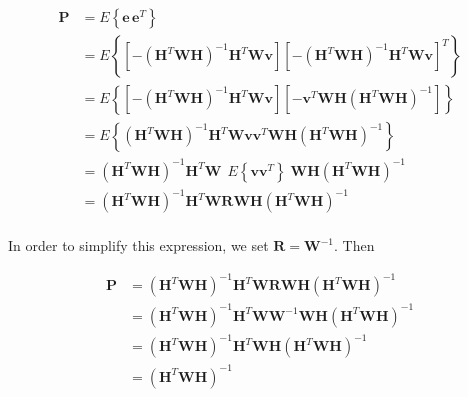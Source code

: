 \documentclass[12pt]{article}
\begin{document}
\begin{equation*}
    \begin{aligned}
        \mathbf{P} &= E \left\{ \mathbf{e} \, \mathbf{e}^T \right\} \\
        &= E \left\{ \left[ - \left( \mathbf{H}^T \mathbf{W} \mathbf{H} \right)^{-1} \mathbf{H}^T \mathbf{W} \mathbf{v} \right]
           \left[ - \left( \mathbf{H}^T \mathbf{W} \mathbf{H} \right)^{-1} \mathbf{H}^T \mathbf{W} \mathbf{v} \right]^T \right\} \\
        &= E \left\{ \left[ - \left( \mathbf{H}^T \mathbf{W} \mathbf{H} \right)^{-1} \mathbf{H}^T \mathbf{W} \mathbf{v} \right]
           \left[ - \mathbf{v}^T \mathbf{W} \mathbf{H} \left( \mathbf{H}^T \mathbf{W} \mathbf{H} \right)^{-1} \right] \right\} \\
        &= E \left\{ \left( \mathbf{H}^T \mathbf{W} \mathbf{H} \right)^{-1} \mathbf{H}^T \mathbf{W} \mathbf{v}
           \mathbf{v}^T \mathbf{W} \mathbf{H} \left( \mathbf{H}^T \mathbf{W} \mathbf{H} \right)^{-1} \right\} \\
        &= \left( \mathbf{H}^T \mathbf{W} \mathbf{H} \right)^{-1} \mathbf{H}^T \mathbf{W}
           \;\, E \left\{ \mathbf{v} \mathbf{v}^T \right\} \;
           \mathbf{W} \mathbf{H} \left( \mathbf{H}^T \mathbf{W} \mathbf{H} \right)^{-1} \\
        &= \left( \mathbf{H}^T \mathbf{W} \mathbf{H} \right)^{-1} \mathbf{H}^T \mathbf{W}
           \mathbf{R}
           \mathbf{W} \mathbf{H} \left( \mathbf{H}^T \mathbf{W} \mathbf{H} \right)^{-1} \\
    \end{aligned}
\end{equation*}

In order to simplify this expression, we set $\mathbf{R} = \mathbf{W}^{-1}$. Then

\begin{equation*}
    \begin{aligned}
        \mathbf{P}
        &= \left( \mathbf{H}^T \mathbf{W} \mathbf{H} \right)^{-1}
           \mathbf{H}^T \mathbf{W} \mathbf{R} \mathbf{W} \mathbf{H}
           \left( \mathbf{H}^T \mathbf{W} \mathbf{H} \right)^{-1} \\
        &= \left( \mathbf{H}^T \mathbf{W} \mathbf{H} \right)^{-1}
           \mathbf{H}^T \mathbf{W} \mathbf{W}^{-1} \mathbf{W} \mathbf{H}
           \left( \mathbf{H}^T \mathbf{W} \mathbf{H} \right)^{-1} \\
        &= \left( \mathbf{H}^T \mathbf{W} \mathbf{H} \right)^{-1}
           \mathbf{H}^T \mathbf{W} \mathbf{H}
           \left( \mathbf{H}^T \mathbf{W} \mathbf{H} \right)^{-1} \\
        &= \left( \mathbf{H}^T \mathbf{W} \mathbf{H} \right)^{-1}  \\
    \end{aligned}
\end{equation*}
\end{document}
